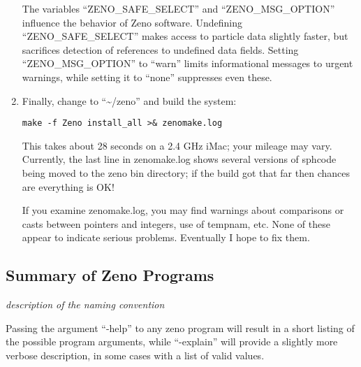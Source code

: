 \begin{enumerate}
{The variables ``ZENO\_SAFE\_SELECT'' and ``ZENO\_MSG\_OPTION'' influence the behavior of Zeno software.  Undefining ``ZENO\_SAFE\_SELECT'' makes access to particle data slightly faster, but sacrifices detection of references to undefined data fields.  Setting ``ZENO\_MSG\_OPTION'' to ``warn'' limits informational messages to urgent warnings, while setting it to ``none'' suppresses even these.}
\item{Finally, change to ``\textasciitilde/zeno'' and build the system:
\begin{verbatim}
make -f Zeno install_all >& zenomake.log
\end{verbatim}
This takes about 28 seconds on a 2.4 GHz iMac; your mileage may vary.  Currently, the last line in zenomake.log shows several versions of sphcode being moved to the zeno bin directory; if the build got that far then chances are everything is OK!

If you examine zenomake.log, you may find warnings about comparisons or casts between pointers and integers, use of tempnam, etc.  None of these appear to indicate serious problems.  Eventually I hope to fix them.}
\end{enumerate}

\subsection{Summary of Zeno Programs}
\label{ssec:programs}

\emph{description of the naming convention}

Passing the argument ``-help'' to any zeno program will result in a short listing of the possible program arguments, while ``-explain'' will provide a slightly more verbose description, in some cases with a list of valid values.

